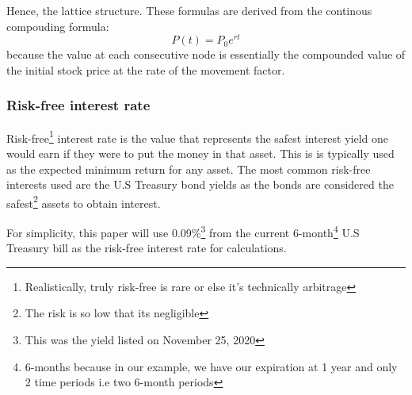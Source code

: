 \documentclass[12pt, letterpaper]{article}\usepackage{float}
\begin{document}
\medskip

\noindent Hence, the lattice structure. These formulas are derived from the continous compouding formula\cite{continouscompoundingformulawikipedia, exponentcharacterizationswikipedia}:
\begin{equation*}
  P(t) = {P_0}e^{rt}
\end{equation*}
because the value at each consecutive node is essentially the compounded value of the initial stock price at the rate of the movement factor.


\subsubsection*{Risk-free interest rate}
Risk-free\footnote{Realistically, truly risk-free is rare or else it's technically arbitrage} interest rate is the value that represents the safest interest yield one would earn if they were to put the money in that asset.
This is is typically used as the expected minimum return for any asset. 
The most common risk-free interests used are the U.S Treasury bond yields as the bonds are considered the safest\footnote{The risk is so low that its negligible} assets to obtain interest.

\medskip

For simplicity, this paper will use 0.09\%\footnote{This was the yield listed on November 25, 2020} from the current 6-month\footnote{6-months because in our example, we have our expiration at 1 year and only 2 time periods i.e two 6-month periods} U.S Treasury bill as the risk-free interest rate for calculations.

\pagebreak
\end{document}
